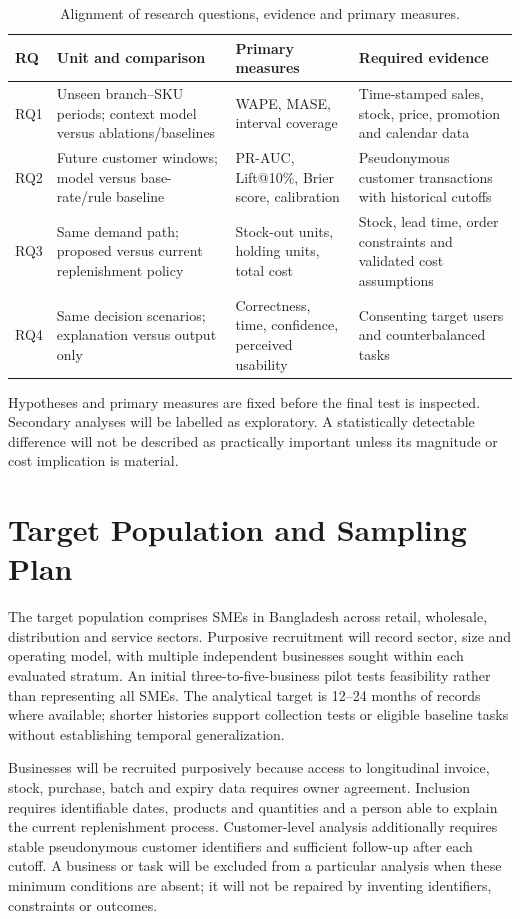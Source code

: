 \begin{table}[H]
\centering
\small
\caption{Alignment of research questions, evidence and primary measures.}
\label{tab:rq_alignment}
\begin{tabularx}{\textwidth}{|p{}|p{}|Y|Y|}
\hline
\textbf{RQ} & \textbf{Unit and comparison} & \textbf{Primary measures} & \textbf{Required evidence} \\
\hline
RQ1 & Unseen branch--SKU periods; context model versus ablations/baselines & WAPE, MASE, interval coverage & Time-stamped sales, stock, price, promotion and calendar data \\
RQ2 & Future customer windows; model versus base-rate/rule baseline & PR-AUC, Lift@10\%, Brier score, calibration & Pseudonymous customer transactions with historical cutoffs \\
RQ3 & Same demand path; proposed versus current replenishment policy & Stock-out units, holding units, total cost & Stock, lead time, order constraints and validated cost assumptions \\
RQ4 & Same decision scenarios; explanation versus output only & Correctness, time, confidence, perceived usability & Consenting target users and counterbalanced tasks \\
\hline
\end{tabularx}
\end{table}

Hypotheses and primary measures are fixed before the final test is inspected.
Secondary analyses will be labelled as exploratory. A statistically detectable
difference will not be described as practically important unless its magnitude
or cost implication is material.

\section{Target Population and Sampling Plan}

The target population comprises SMEs in Bangladesh across retail,
wholesale, distribution and service sectors. Purposive recruitment will record
sector, size and operating model, with multiple independent businesses sought
within each evaluated stratum. An initial three-to-five-business pilot tests
feasibility rather than representing all SMEs. The analytical target is
12--24 months of records where available; shorter histories support collection
tests or eligible baseline tasks without establishing temporal generalization.

Businesses will be recruited purposively because access to longitudinal invoice,
stock, purchase, batch and expiry data requires owner agreement. Inclusion
requires identifiable dates, products and quantities and a person able to
explain the current replenishment process. Customer-level analysis additionally
requires stable pseudonymous customer identifiers and sufficient follow-up
after each cutoff. A business or task will be excluded from a particular
analysis when these minimum conditions are absent; it will not be repaired by
inventing identifiers, constraints or outcomes.

